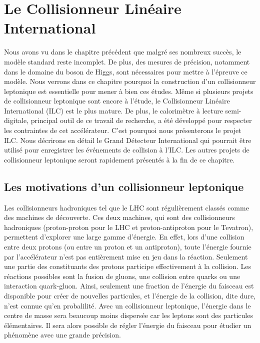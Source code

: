 \chapter{Le Collisionneur Linéaire International}
\label{chap.ilc}
Nous avons vu dans le chapitre précédent que malgré ses nombreux succès, le modèle standard reste incomplet. De plus, des mesures de précision, notamment dans le domaine du boson de Higgs, sont nécessaires pour mettre à l'épreuve ce modèle. Nous verrons dans ce chapitre pourquoi la construction d'un collisionneur leptonique est essentielle pour mener à bien ces études. Même si plusieurs projets de collisionneur leptonique sont encore à l'étude, le Collisionneur Linéaire International (ILC) est le plus mature. De plus, le calorimètre à lecture semi-digitale, principal outil de ce travail de recherche, a été développé pour respecter les contraintes de cet accélérateur. C'est pourquoi nous présenterons le projet ILC. Nous décrirons en détail le Grand Détecteur International qui pourrait être utilisé pour enregistrer les événements de collision à l'ILC. Les autres projets de collisionneur leptonique seront rapidement présentés à la fin de ce chapitre.
\minitoc
\newpage


\section{Les motivations d'un collisionneur leptonique}
Les collisionneurs hadroniques tel que le LHC sont régulièrement classés comme des machines de découverte. Ces deux machines, qui sont des collisionneurs hadroniques (proton-proton pour le LHC et proton-antiproton pour le Tevatron), permettent d'explorer une large gamme d'énergie. En effet, lors d'une collision entre deux protons (ou entre un proton et un antiproton), toute l'énergie fournie par l'accélérateur n'est pas entièrement mise en jeu dans la réaction. Seulement une partie des constituants des protons participe effectivement à la collision. Les réactions possibles sont la fusion de gluons, une collision entre quarks ou une interaction quark-gluon. Ainsi, seulement une fraction de l'énergie du faisceau est disponible pour créer de nouvelles particules, et l'énergie de la collision, dite dure, n'est connue qu'en probalilité. Avec un collisionneur leptonique, l'énergie dans le centre de masse sera beaucoup moins dispersée car les leptons sont des particules élémentaires. Il sera alors possible de régler l'énergie du faisceau pour étudier un phénomène avec une grande précision. 

